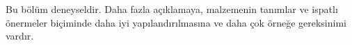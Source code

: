 


\begin{editorial}
  Bu bölüm deneyseldir. Daha fazla açıklamaya, malzemenin tanımlar ve
  ispatlı önermeler biçiminde daha iyi yapılandırılmasına ve daha çok örneğe
  gereksinimi vardır.
\end{editorial}


\OLEndChapterHook

